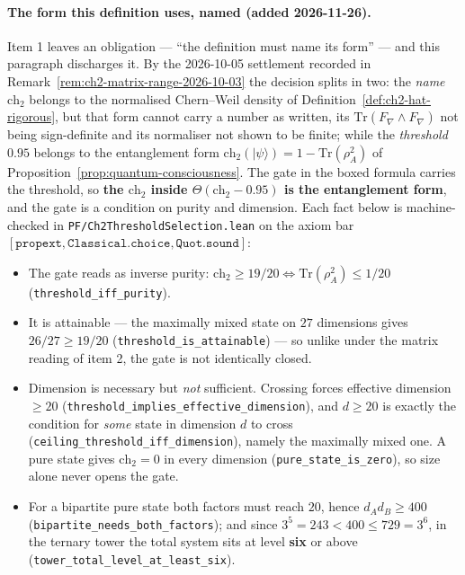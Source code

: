 \paragraph{The form this definition uses, named (added 2026-11-26).}
Item 1 leaves an obligation --- ``the definition must name its form'' --- and
this paragraph discharges it. By the 2026-10-05 settlement recorded in
Remark~\ref{rem:ch2-matrix-range-2026-10-03} the decision splits in two: the
\emph{name} $\text{ch}_2$ belongs to the normalised Chern--Weil density of
Definition~\ref{def:ch2-hat-rigorous}, but that form cannot carry a number as
written, its $\mathrm{Tr}(F_\nabla \wedge F_\nabla)$ not being sign-definite and
its normaliser not shown to be finite; while the \emph{threshold} $0.95$ belongs
to the entanglement form
$\text{ch}_2(|\psi\rangle) = 1 - \mathrm{Tr}(\rho_A^2)$ of
Proposition~\ref{prop:quantum-consciousness}. The gate in the boxed formula
carries the threshold, so \textbf{the $\text{ch}_2$ inside
$\Theta(\text{ch}_2 - 0.95)$ is the entanglement form}, and the gate is a
condition on purity and dimension. Each fact below is machine-checked in
\texttt{PF/Ch2ThresholdSelection.lean} on the axiom bar
$[\mathtt{propext}, \mathtt{Classical.choice}, \mathtt{Quot.sound}]$:

\begin{itemize}
\item The gate reads as inverse purity:
  $\text{ch}_2 \geq 19/20 \iff \mathrm{Tr}(\rho_A^2) \leq 1/20$
  (\texttt{threshold\_iff\_purity}).
\item It is attainable --- the maximally mixed state on $27$ dimensions gives
  $26/27 \geq 19/20$ (\texttt{threshold\_is\_attainable}) --- so unlike under
  the matrix reading of item 2, the gate is not identically closed.
\item Dimension is necessary but \emph{not} sufficient. Crossing forces
  effective dimension $\geq 20$
  (\texttt{threshold\_implies\_effective\_dimension}), and $d \geq 20$ is
  exactly the condition for \emph{some} state in dimension $d$ to cross
  (\texttt{ceiling\_threshold\_iff\_dimension}), namely the maximally mixed
  one. A pure state gives $\text{ch}_2 = 0$ in every dimension
  (\texttt{pure\_state\_is\_zero}), so size alone never opens the gate.
\item For a bipartite pure state both factors must reach $20$, hence
  $d_A d_B \geq 400$ (\texttt{bipartite\_needs\_both\_factors}); and since
  $3^5 = 243 < 400 \leq 729 = 3^6$, in the ternary tower the total system sits
  at level \textbf{six} or above
  (\texttt{tower\_total\_level\_at\_least\_six}).
\end{itemize}


